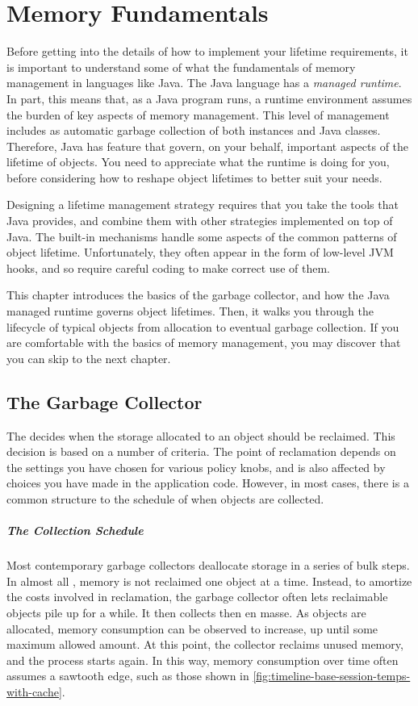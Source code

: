 
\chapter{Memory Fundamentals}

Before getting into the details of how to implement your lifetime requirements,
it is important to understand some of what the fundamentals of memory management
in languages like Java. The Java language has a \emph{managed runtime}. In part,
this means that, as a Java program runs, a runtime environment assumes the burden
of key aspects of memory management. This level of management includes as
automatic garbage collection of both instances and Java classes. Therefore, Java
has feature that govern, on your behalf, important aspects of the lifetime of
objects. You need to appreciate what the runtime is doing for you, before
considering how to reshape object lifetimes to better suit your needs.

Designing a lifetime management strategy requires that you take the tools that
Java provides, and combine them with other strategies implemented on top of Java.
The built-in mechanisms handle some aspects of the common patterns of object
lifetime. Unfortunately, they often appear in the form of low-level JVM hooks,
and so require careful coding to make correct use of them.

This chapter introduces the basics of the garbage collector, and how the Java
managed runtime governs object lifetimes. Then, it walks you through the
lifecycle of typical objects from allocation to eventual garbage collection. If
you are comfortable with the basics of memory management, you may discover that
you can skip to the next chapter.

\section{The Garbage Collector}
The \jre decides when the storage allocated to an object should be reclaimed.
This decision is based on a number of criteria. The point of reclamation
depends on the settings you have chosen for various policy knobs, and is also
affected by choices you have made in the application code. However, in most
cases, there is a common structure to the schedule of when objects are
collected.

\paragraph{The Collection Schedule}
Most contemporary garbage collectors deallocate storage in a series of bulk
steps. In almost all \jres, memory is not reclaimed one object at a time.
Instead, to amortize the costs involved in reclamation, the garbage collector
often lets reclaimable objects pile up for a while. It then collects then en
masse. As objects are allocated, memory consumption can be observed to increase,
up until some maximum allowed amount. At this point, the collector reclaims
unused memory, and the process starts again. In this way, memory consumption over
time often assumes a sawtooth edge, such as those shown in
\autoref{fig:timeline-base-session-temps-with-cache}.


